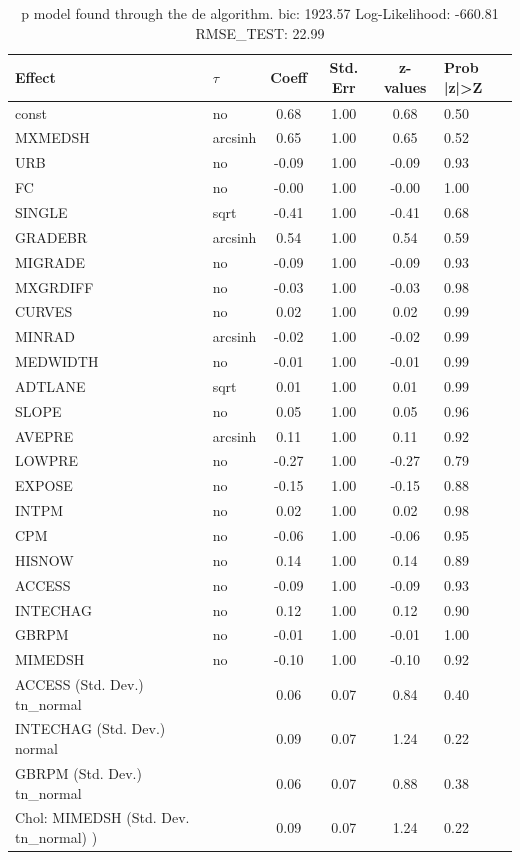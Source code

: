 \begin{table}
	\caption{p model found through the de algorithm. bic: 1923.57 Log-Likelihood: -660.81 RMSE_TEST: 22.99}
	\begin{center}
		\begin{tabular}{|l|l|c|c|c|l|}
			\hline
			Effect & $\tau$ & Coeff & Std. Err & z-values & Prob |z|>Z \\
			\hline
			const & no & 0.68 & 1.00 & 0.68 & 0.50 \\
			\hline
			MXMEDSH & arcsinh & 0.65 & 1.00 & 0.65 & 0.52 \\
			\hline
			URB & no & -0.09 & 1.00 & -0.09 & 0.93 \\
			\hline
			FC & no & -0.00 & 1.00 & -0.00 & 1.00 \\
			\hline
			SINGLE & sqrt & -0.41 & 1.00 & -0.41 & 0.68 \\
			\hline
			GRADEBR & arcsinh & 0.54 & 1.00 & 0.54 & 0.59 \\
			\hline
			MIGRADE & no & -0.09 & 1.00 & -0.09 & 0.93 \\
			\hline
			MXGRDIFF & no & -0.03 & 1.00 & -0.03 & 0.98 \\
			\hline
			CURVES & no & 0.02 & 1.00 & 0.02 & 0.99 \\
			\hline
			MINRAD & arcsinh & -0.02 & 1.00 & -0.02 & 0.99 \\
			\hline
			MEDWIDTH & no & -0.01 & 1.00 & -0.01 & 0.99 \\
			\hline
			ADTLANE & sqrt & 0.01 & 1.00 & 0.01 & 0.99 \\
			\hline
			SLOPE & no & 0.05 & 1.00 & 0.05 & 0.96 \\
			\hline
			AVEPRE & arcsinh & 0.11 & 1.00 & 0.11 & 0.92 \\
			\hline
			LOWPRE & no & -0.27 & 1.00 & -0.27 & 0.79 \\
			\hline
			EXPOSE & no & -0.15 & 1.00 & -0.15 & 0.88 \\
			\hline
			INTPM & no & 0.02 & 1.00 & 0.02 & 0.98 \\
			\hline
			CPM & no & -0.06 & 1.00 & -0.06 & 0.95 \\
			\hline
			HISNOW & no & 0.14 & 1.00 & 0.14 & 0.89 \\
			\hline
			ACCESS & no & -0.09 & 1.00 & -0.09 & 0.93 \\
			\hline
			INTECHAG & no & 0.12 & 1.00 & 0.12 & 0.90 \\
			\hline
			GBRPM & no & -0.01 & 1.00 & -0.01 & 1.00 \\
			\hline
			MIMEDSH & no & -0.10 & 1.00 & -0.10 & 0.92 \\
			\hline
			ACCESS (Std. Dev.) tn_normal &  & 0.06 & 0.07 & 0.84 & 0.40 \\
			\hline
			INTECHAG (Std. Dev.) normal &  & 0.09 & 0.07 & 1.24 & 0.22 \\
			\hline
			GBRPM (Std. Dev.) tn_normal &  & 0.06 & 0.07 & 0.88 & 0.38 \\
			\hline
			 Chol: MIMEDSH (Std. Dev. tn_normal) ) &  & 0.09 & 0.07 & 1.24 & 0.22 \\
			\hline
		\end{tabular}
	\end{center}
\end{table}